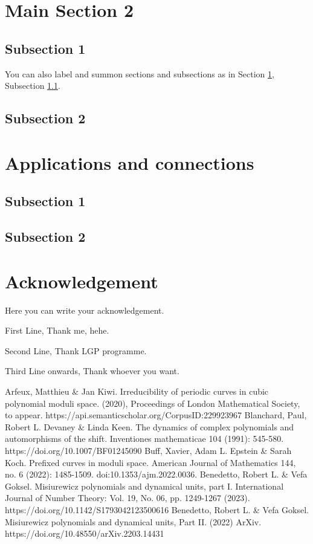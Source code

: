 \documentclass[reqno]{amsart}
\numberwithin{equation}{section}
\theoremstyle{plain}
\theoremstyle{definition}
\theoremstyle{definition}
\begin{document}
\section{Main Section 2}\label{main2}

    \subsection{Subsection 1}\label{sub1}
     You can also label and summon sections and subsections as in Section \ref{main2}, Subsection \ref{sub1}.
    
    \subsection{Subsection 2} 

\section{Applications and connections}

    \subsection{Subsection 1}
    
    \subsection{Subsection 2} 

\section*{Acknowledgement}
    Here you can write your acknowledgement.

    First Line, Thank me, hehe.

    Second Line, Thank LGP programme.

    Third Line onwards, Thank whoever you want.


\begin{thebibliography}{10}
        Arfeux, Matthieu \& Jan Kiwi.  Irreducibility of periodic curves in cubic polynomial moduli space. (2020), Proceedings of London Mathematical Society, to appear. https://api.semanticscholar.org/CorpusID:229923967
        Blanchard, Paul, Robert L. Devaney \& Linda Keen.  The dynamics of complex polynomials and automorphisms of the shift. Inventiones mathematicae 104 (1991): 545-580. https://doi.org/10.1007/BF01245090
        Buff, Xavier, Adam L. Epstein \& Sarah Koch.  Prefixed curves in moduli space. American Journal of Mathematics 144, no. 6 (2022): 1485-1509. doi:10.1353/ajm.2022.0036.
        Benedetto, Robert L. \& Vefa Goksel.  Misiurewicz polynomials and dynamical units, part I. International Journal of Number Theory: Vol. 19, No. 06, pp. 1249-1267 (2023). https://doi.org/10.1142/S1793042123500616
        Benedetto, Robert L. \& Vefa Goksel. Misiurewicz polynomials and dynamical units, Part II. (2022) ArXiv. https://doi.org/10.48550/arXiv.2203.14431
    
   
\end{thebibliography}
\end{document}

